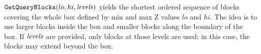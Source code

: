 $\hbox{\tt GetQueryBlocks}(lo,hi,{\it levels})$ yields the
shortest ordered sequence of blocks covering the whole box
defined by min and max Z values $lo$ and $hi$. The idea is
to use larger blocks inside the box and smaller blocks
along the boundary of the box.
If ${\it levels}$ are provided, only blocks at those levels
are used; in this case, the blocks may extend beyond the box.

\bye
